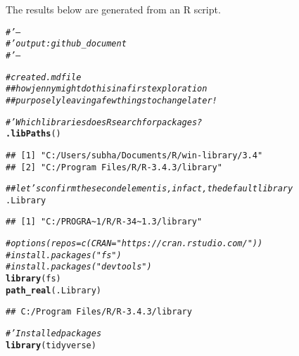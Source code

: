 \documentclass{article}\usepackage[]{graphicx}\usepackage[]{color}
\makeatletter
\newcommand{\hlcom}[1]{\textcolor[rgb]{0.678,0.584,0.686}{\textit{#1}}}%
\newcommand{\hlstd}[1]{\textcolor[rgb]{0.345,0.345,0.345}{#1}}%
\newcommand{\hlkwd}[1]{\textcolor[rgb]{0.737,0.353,0.396}{\textbf{#1}}}%
\newenvironment{kframe}{%
 \def\at@end@of@kframe{}%
 \ifinner\ifhmode%
  \def\at@end@of@kframe{\end{minipage}}%
  \begin{minipage}{\columnwidth}%
 \fi\fi%
 \def\FrameCommand##1{\hskip\@totalleftmargin \hskip-\fboxsep
 \colorbox{shadecolor}{##1}\hskip-\fboxsep
     \hskip-\linewidth \hskip-\@totalleftmargin \hskip\columnwidth}%
 \MakeFramed {\advance\hsize-\width
   \@totalleftmargin\z@ \linewidth\hsize
   \@setminipage}}%
 {\par\unskip\endMakeFramed%
 \at@end@of@kframe}
\newenvironment{knitrout}{}{} %
\makeatother
\begin{document}
The results below are generated from an R script.

\begin{knitrout}
\color{fgcolor}\begin{kframe}
\begin{alltt}
\hlcom{#' ---}
\hlcom{#' output: github_document}
\hlcom{#' ---}

\hlcom{#created .md file}
\hlcom{## how jenny might do this in a first exploration}
\hlcom{## purposely leaving a few things to change later!}



\hlcom{#' Which libraries does R search for packages?}
\hlkwd{.libPaths}\hlstd{()}
\end{alltt}
\begin{verbatim}
## [1] "C:/Users/subha/Documents/R/win-library/3.4"
## [2] "C:/Program Files/R/R-3.4.3/library"
\end{verbatim}
\begin{alltt}
\hlcom{## let's confirm the second element is, in fact, the default library}
\hlstd{.Library}
\end{alltt}
\begin{verbatim}
## [1] "C:/PROGRA~1/R/R-34~1.3/library"
\end{verbatim}
\begin{alltt}
\hlcom{#options(repos = c(CRAN = "https://cran.rstudio.com/"))}
\hlcom{#install.packages("fs")}
\hlcom{#install.packages("devtools")}
\hlkwd{library}\hlstd{(fs)}
\hlkwd{path_real}\hlstd{(.Library)}
\end{alltt}
\begin{verbatim}
## C:/Program Files/R/R-3.4.3/library
\end{verbatim}
\begin{alltt}
\hlcom{#' Installed packages}
\hlkwd{library}\hlstd{(tidyverse)}
\end{alltt}


{\ttfamily\noindent\itshape\color{messagecolor}{\#\# -- Attaching packages -------------------------------------------------------------------------------------- tidyverse 1.2.1 --}}

{\ttfamily\noindent\itshape\color{messagecolor}{\#\# v ggplot2 2.2.1\ \ \ \  v purrr\ \  0.2.4\\\#\# v tibble\ \ 1.4.2\ \ \ \  v dplyr\ \  0.7.4\\\#\# v tidyr\ \  0.7.2\ \ \ \  v stringr 1.2.0\\\#\# v readr\ \  1.1.1\ \ \ \  v forcats 0.2.0}}


\end{kframe}
\end{knitrout}
\end{document}
